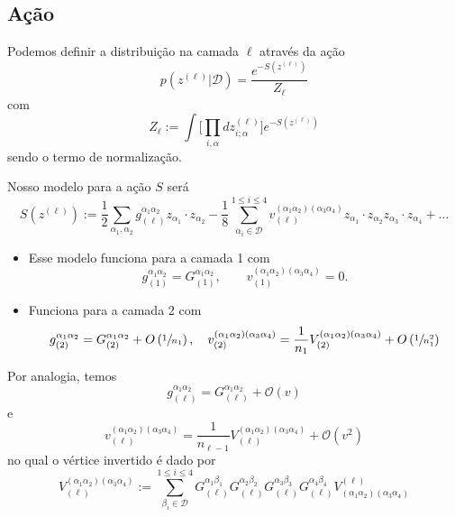 \documentclass{beamer}
\def\mi#1{{\alpha_{#1}}}
\def\mj#1{\beta_{#1}}
\def\eell{{(\ell)}}
\newcommand{\Gnormalinv}[3]{{G_{(#1)}^{\mi{#2}\mi{#3}}}}
\newcommand{\Verticeinv}[5]{V_{(#1)}^{(\mi#2\mi#3)(\mi#4\mi#5)}}
\begin{document}
\subsection{Ação}

\begin{frame}
	Podemos definir a distribuição na camada $\ell$ através da ação
	\begin{equation*}\tag{4.78}
		p\left(z^\eell \Big| \mathcal{D}\right) = \frac{e^{-S(z^\eell)}}{Z_\ell}
	\end{equation*}
	com 
	\begin{equation*}\tag{4.79}
		Z_\ell := \int\bigg[{\prod_{i,\alpha}} dz_{i;\alpha}^\eell\bigg]e^{-S(z^\eell)}
	\end{equation*}
	sendo o termo de normalização.
\end{frame}

\begin{frame}
	Nosso modelo para a ação $S$ será
	{\footnotesize
	\begin{equation*}\tag{4.80}
		S(z^\eell) := \frac{1}{2}\sum_{\mi1,\mi2}g^{\mi1\mi2}_{\eell} z_{\mi1}{\cdot}z_{\mi2} - \frac{1}{8}\sum_{\mi{i}\in\mathcal{D}}^{1\le i \le 4} v^{(\mi1\mi2)(\mi3\mi4)}_{\eell} z_{\mi1}{\cdot}z_{\mi2} z_{\mi3}{\cdot}z_{\mi4}+\ldots
	\end{equation*}}
	\begin{itemize}
		\item Esse modelo funciona para a camada 1 com 
		$$g^{\mi1\mi2}_{(1)} = \Gnormalinv112, \qquad v_{(1)}^{(\mi1\mi2)(\mi3\mi4)} = 0.$$
		\item Funciona para a camada 2 com 
		{\small
		$$g^{\mi1\mi2}_{(2)} = \Gnormalinv212 + {O}\left(\sfrac{1}{n_1}\right), \quad v_{(2)}^{(\mi1\mi2)(\mi3\mi4)} = \frac{1}{n_1}\Verticeinv21234 + O\left(\sfrac{1}{n_1^2}\right) $$ }
	\end{itemize}
\end{frame}
\begin{frame}
	
Por analogia, temos
	\begin{equation*}\tag{4.81}
		g^{\mi1\mi2}_{\eell} = \Gnormalinv{\ell}12 + \mathcal{O}(v)
	\end{equation*}
	e 
	\begin{equation*}\tag{4.82}
		v^{(\mi1\mi2)(\mi3\mi4)}_{\eell} = \frac{1}{n_{\ell-1}}\Verticeinv{\ell}1234 + \mathcal{O}(v^2)
	\end{equation*}
no qual o vértice invertido é dado por
	\begin{equation*}\tag{4.83}
		\Verticeinv{\ell}1234 := \sum_{\mj{i}\in\mathcal{D}}^{1\le i \le 4} G^{\mi1\mj1}_\eell G^{\mi2\mj2}_\eell G^{\mi3\mj3}_\eell G^{\mi4\mj4}_\eell V^\eell_{(\mi1\mi2)(\mi3\mi4)}
	\end{equation*}
\end{frame}
\end{document}
